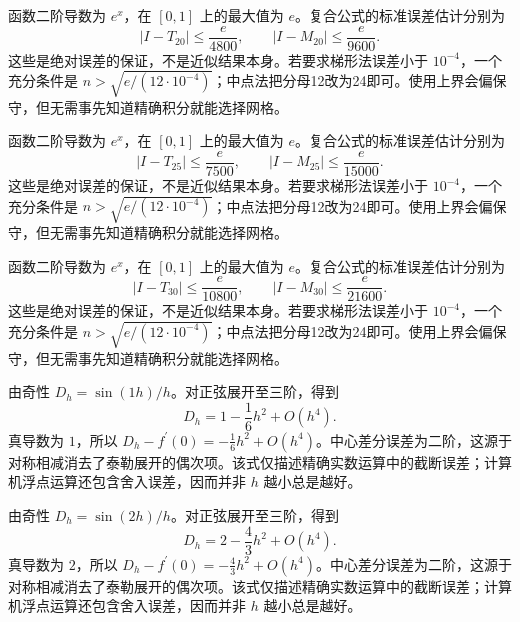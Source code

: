 \documentclass[12pt,fontset=fandol]{ctexart}
\begin{document}
\begin{solve}\label{ans:c18q16}
函数二阶导数为 $e^x$，在 $[0,1]$ 上的最大值为 $e$。复合公式的标准误差估计分别为
\[
|I-T_{20}|\le\frac e{4800},\qquad |I-M_{20}|\le\frac e{9600}.
\]
这些是绝对误差的保证，不是近似结果本身。若要求梯形法误差小于 $10^{-4}$，一个充分条件是 $n>\sqrt{e/(12\cdot10^{-4})}$；中点法把分母12改为24即可。使用上界会偏保守，但无需事先知道精确积分就能选择网格。
\end{solve}

\begin{solve}\label{ans:c18q17}
函数二阶导数为 $e^x$，在 $[0,1]$ 上的最大值为 $e$。复合公式的标准误差估计分别为
\[
|I-T_{25}|\le\frac e{7500},\qquad |I-M_{25}|\le\frac e{15000}.
\]
这些是绝对误差的保证，不是近似结果本身。若要求梯形法误差小于 $10^{-4}$，一个充分条件是 $n>\sqrt{e/(12\cdot10^{-4})}$；中点法把分母12改为24即可。使用上界会偏保守，但无需事先知道精确积分就能选择网格。
\end{solve}

\begin{solve}\label{ans:c18q18}
函数二阶导数为 $e^x$，在 $[0,1]$ 上的最大值为 $e$。复合公式的标准误差估计分别为
\[
|I-T_{30}|\le\frac e{10800},\qquad |I-M_{30}|\le\frac e{21600}.
\]
这些是绝对误差的保证，不是近似结果本身。若要求梯形法误差小于 $10^{-4}$，一个充分条件是 $n>\sqrt{e/(12\cdot10^{-4})}$；中点法把分母12改为24即可。使用上界会偏保守，但无需事先知道精确积分就能选择网格。
\end{solve}

\begin{solve}\label{ans:c18q19}
由奇性 $D_h=\sin(1h)/h$。对正弦展开至三阶，得到
\[
D_h=1-\frac{1}{6}h^2+O(h^4).
\]
真导数为 $1$，所以 $D_h-f^{\prime}(0)=-\frac{1}{6}h^2+O(h^4)$。中心差分误差为二阶，这源于对称相减消去了泰勒展开的偶次项。该式仅描述精确实数运算中的截断误差；计算机浮点运算还包含舍入误差，因而并非 $h$ 越小总是越好。
\end{solve}

\begin{solve}\label{ans:c18q20}
由奇性 $D_h=\sin(2h)/h$。对正弦展开至三阶，得到
\[
D_h=2-\frac{4}{3}h^2+O(h^4).
\]
真导数为 $2$，所以 $D_h-f^{\prime}(0)=-\frac{4}{3}h^2+O(h^4)$。中心差分误差为二阶，这源于对称相减消去了泰勒展开的偶次项。该式仅描述精确实数运算中的截断误差；计算机浮点运算还包含舍入误差，因而并非 $h$ 越小总是越好。
\end{solve}
\end{document}

